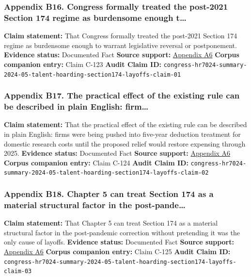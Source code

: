 \documentclass[
  american,
  11pt,
  letterpaper,
]{article}
\begin{document}
\subsubsection{Appendix B16. Congress formally treated the post-2021
Section 174 regime as burdensome enough
t\ldots{}}\label{ch-05-appendix-b16-congress-formally-treated-the-post-2021-section-174-regime-as-burdensome-enough-t}

\textbf{Claim statement:} That Congress formally treated the post-2021
Section 174 regime as burdensome enough to warrant legislative reversal
or postponement. \textbf{Evidence status:} Documented Fact
\textbf{Source support:}
\hyperref[ch-05-appendix-a6-h-r-7024-tax-relief-for-american-families-and-workers-act-of-2024-crs-summary]{Appendix
A6} \textbf{Corpus companion entry:} Claim C-123 \textbf{Audit Claim
ID:}
\texttt{congress-hr7024-summary-2024-05-talent-hoarding-section174-layoffs-claim-01}

\subsubsection{Appendix B17. The practical effect of the existing rule
can be described in plain English:
firm\ldots{}}\label{ch-05-appendix-b17-the-practical-effect-of-the-existing-rule-can-be-described-in-plain-english-firm}

\textbf{Claim statement:} That the practical effect of the existing rule
can be described in plain English: firms were being pushed into
five-year deduction treatment for domestic research costs until the
proposed relief would restore expensing through 2025. \textbf{Evidence
status:} Documented Fact \textbf{Source support:}
\hyperref[ch-05-appendix-a6-h-r-7024-tax-relief-for-american-families-and-workers-act-of-2024-crs-summary]{Appendix
A6} \textbf{Corpus companion entry:} Claim C-124 \textbf{Audit Claim
ID:}
\texttt{congress-hr7024-summary-2024-05-talent-hoarding-section174-layoffs-claim-02}

\subsubsection{Appendix B18. Chapter 5 can treat Section 174 as a
material structural factor in the
post-pande\ldots{}}\label{ch-05-appendix-b18-chapter-5-can-treat-section-174-as-a-material-structural-factor-in-the-post-pande}

\textbf{Claim statement:} That Chapter 5 can treat Section 174 as a
material structural factor in the post-pandemic correction without
pretending it was the only cause of layoffs. \textbf{Evidence status:}
Documented Fact \textbf{Source support:}
\hyperref[ch-05-appendix-a6-h-r-7024-tax-relief-for-american-families-and-workers-act-of-2024-crs-summary]{Appendix
A6} \textbf{Corpus companion entry:} Claim C-125 \textbf{Audit Claim
ID:}
\texttt{congress-hr7024-summary-2024-05-talent-hoarding-section174-layoffs-claim-03}
\end{document}
